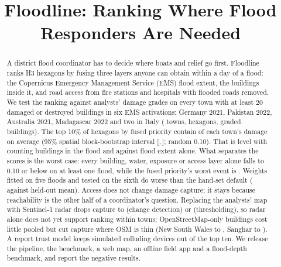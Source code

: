 \documentclass[conference]{IEEEtran}
\newcommand{\ci}[2]{[#1,\,#2]}
\begin{document}
\title{Floodline: Ranking Where Flood Responders Are Needed}

\author{
}

\maketitle

\begin{abstract}
A district flood coordinator has to decide where boats and relief go first. Floodline ranks H3 hexagons by fusing three layers anyone can obtain within a day of a flood: the Copernicus Emergency Management Service (EMS) flood extent, the buildings inside it, and road access from fire stations and hospitals with flooded roads removed. We test the ranking against analysts' damage grades on every town with at least 20 damaged or destroyed buildings in six EMS activations: Germany 2021, Pakistan 2022, Australia 2021, Madagascar 2022 and two in Italy (\nTowns{} towns, \nHexes{} hexagons, \nSevere{} graded buildings). The top 10\% of hexagons by fused priority contain \capEHA{} of each town's damage on average (95\% spatial block-bootstrap interval \ci{\capEHALo}{\capEHAHi}; random 0.10). That is level with counting buildings in the flood and \dWater{} against flood extent alone. What separates the scores is the worst case: every building, water, exposure or access layer alone falls to 0.10 or below on at least one flood, while the fused priority's worst event is \worstEHA{}. Weights fitted on five floods and tested on the sixth do worse than the hand-set default (\loeoFitted{} against \loeoDefault{} held-out mean). Access does not change damage capture; it stays because reachability is the other half of a coordinator's question. Replacing the analysts' map with Sentinel-1 radar drops capture to \ablChangeEHA{} (change detection) or \ablOtsuEHA{} (thresholding), so radar alone does not yet support ranking within towns; OpenStreetMap-only buildings cost little pooled but cut capture where OSM is thin (New South Wales \osmOnlyNSWRef{} to \osmOnlyNSW{}, Sanghar \osmOnlySangharRef{} to \osmOnlySanghar{}). A report trust model keeps simulated colluding devices out of the top ten. We release the pipeline, the benchmark, a web map, an offline field app and a flood-depth benchmark, and report the negative results.
\end{abstract}
\end{document}
